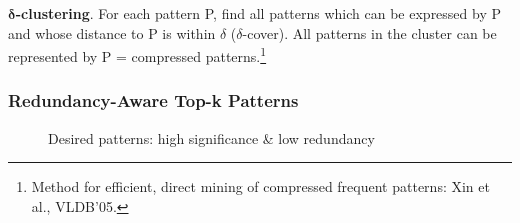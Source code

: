 \textbf{$\mathbf{\delta}$-clustering}. For each pattern P, find all patterns which can be expressed by P and whose distance to P is within $\delta$ ($\delta$-cover). All patterns in the cluster can be represented by P = compressed patterns.\footnote{Method for efficient, direct mining of compressed frequent patterns: Xin et al., VLDB’05.}

\subsubsection{Redundancy-Aware Top-k Patterns}

\begin{figure}[h]
\centering
{}
\quad
{}
\quad
{}
%
\caption{Desired patterns: high significance \& low redundancy}
\label{fig:desired}
\end{figure}


